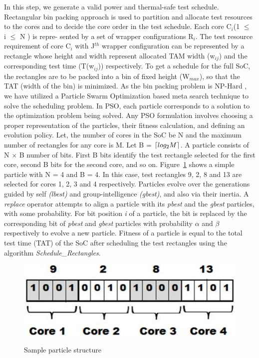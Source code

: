 \documentclass[conference]{IEEEtran}
\DeclarePairedDelimiter{\ceil}{\lceil}{\rceil}
\begin{document}
	In this step, we generate a valid power and thermal-safe test
schedule. Rectangular bin packing approach is used to partition
and allocate test resources to the cores and to decide the core
order in the test schedule. Each core C$_{i}$(1 $\leq$ i $\leq$ N ) is repre-
sented by a set of wrapper configurations R$_{i}$. The test resource
requirement of core C$_{i}$ with J$^{th}$ wrapper configuration can be
represented by a rectangle whose height and width represent
allocated TAM width (w$_{ij}$) and the corresponding test time
(T(w$_{ij}$)) respectively. To get a schedule for the full SoC, the
rectangles are to be packed into a bin of fixed height (W$_{max}$),
so that the TAT (width of the bin) is minimized. As the bin
packing problem is NP-Hard \cite{iyengar2002using}, we have utilized a Particle
Swarm Optimization based meta search technique to solve the
scheduling problem. In PSO, each particle corresponds to a
solution to the optimization problem being solved. Any PSO
formulation involves choosing a proper representation of the
particles, their fitness calculation, and defining an evolution
policy. Let, the number of cores in the SoC be N and
the maximum number of rectangles for any core is M. Let
B = $\ceil*{log_{2}M}$. A particle consists of N $\times$ B number of bits.
First B bits identify the test rectangle selected for the first
core, second B bits for the second core, and so on. Figure~\ref{fig: 3}
shows a simple particle with N = 4 and B = 4. In this case,
test rectangles 9, 2, 8 and 13 are selected for cores 1, 2, 3 and
4 respectively. Particles evolve over the generations guided by
self \textit{(lbest)} and group-intelligence \textit{(gbest)}, and also via their
inertia. A \textit{replace} operator attempts to align a particle with its
\textit{pbest} and the \textit{gbest} particles, with some probability. For bit
position \textit{i} of a particle, the bit is replaced by the corresponding
bit of \textit{pbest} and \textit{gbest} particles with probability $\alpha$ and $\beta$
respectively to evolve a new particle. Fitness of a particle is
equal to the total test time (TAT) of the SoC after scheduling
the test rectangles using the algorithm \textit{Schedule\_Rectangles}.



\begin{figure}[ht]
		{\includegraphics[width=\columnwidth]{3.png}}
		\caption{Sample particle structure}
        \label{fig: 3}
\end{figure}
\end{document}
